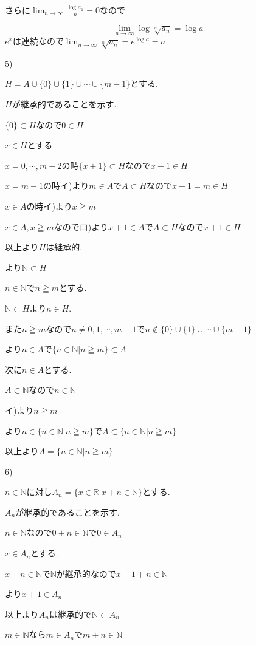 \documentclass{jsarticle}
\begin{document}
さらに$\displaystyle\lim_{n\to\infty} \frac{\log a_1}{n} = 0$なので


\[\lim_{n\to\infty}\log \sqrt[n]{a_n} = \log a\]
$e^x$は連続なので$\displaystyle\lim_{n\to\infty}\sqrt[n]{a_n} = e^{\log a} = a$

5)

$H = A\cup \{0\} \cup \{1\} \cup \cdots \cup \{m-1\}$とする.

$H$が継承的であることを示す.

$\{0\}\subset H$なので$0\in H$

$x\in H$とする

$x = 0,\cdots , m-2$の時$\{x+1\}\subset H$なので$x+1\in H$

$x = m-1$の時イ)より$m\in A$で$A\subset H$なので$x+1=m\in H$

$x\in A$の時イ)より$x\geqq m$

$x\in A,x\geqq m$なのでロ)より$x+1\in A$で$A\subset H$なので$x+1\in H$

以上より$H$は継承的.

より$\mathbb{N}\subset H$

$n\in \mathbb{N}$で$n\geqq m$とする.

$\mathbb{N}\subset H$より$n\in H$.

また$n\geqq m$なので$n \neq 0,1,\cdots , m-1$で$n\notin  \{0\} \cup \{1\} \cup \cdots \cup \{m-1\}$

より$n\in A$で$\{n\in \mathbb{N}|n\geqq m\}\subset A$

次に$n\in A$とする.

$A\subset \mathbb{N}$なので$n\in\mathbb{N}$

イ)より$n\geqq m$

より$n\in \{n\in \mathbb{N}|n\geqq m\}$で$A\subset \{n\in \mathbb{N}|n\geqq m\}$

以上より$A=\{n\in \mathbb{N}|n\geqq m\}$

6)

$n\in \mathbb{N}$に対し$A_n=\{x\in \mathbb{R}|x+n\in\mathbb{N}\}$とする.

$A_n$が継承的であることを示す.

$n\in \mathbb{N}$なので$0+n\in \mathbb{N}$で$0\in A_n$

$x\in A_n$とする.

$x+n\in \mathbb{N}$で$\mathbb{N}$が継承的なので$x+1+n\in \mathbb{N}$

より$x+1\in A_n$

以上より$A_n$は継承的で$\mathbb{N} \subset A_n$

$m\in \mathbb{N}$なら$m\in A_n$で$m+n\in\mathbb{N}$
\end{document}
